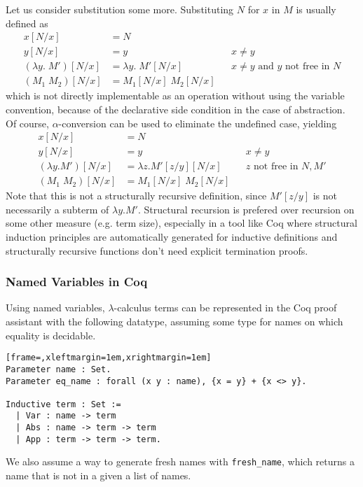 \documentclass[a4paper,11pt]{article}
\begin{document}
Let us consider substitution some more.
Substituting $N$ for $x$ in $M$ is usually defined as
\begin{align*}
  x[N/x]                 &= N\\
  y[N/x]                 &= y                      && \text{$x \neq y$} \\
  (\lambda y.\; M')[N/x] &= \lambda y. \; M'[N/x]  && \text{$x \neq y$ and $y$ not free in $N$} \\ %
  (M_1 \; M_2)[N/x]      &= M_1[N/x] \; M_2[N/x]
\end{align*}
which is not directly implementable as an operation without using the
variable convention, because of the declarative side condition in the
case of abstraction.
Of course, $\alpha$-conversion can be used to eliminate the undefined
case, yielding
\begin{align*}
  x[N/x]              &= N\\
  y[N/x]              &= y                       && \text{$x \neq y$} \\
  (\lambda y.M')[N/x] &= \lambda z.M'[z/y][N/x]  && \text{$z$ not free in $N, M'$} \\ %
  (M_1 \; M_2)[N/x]   &= M_1[N/x] \; M_2[N/x]
\end{align*}
Note that this is not a structurally recursive definition, since
$M'[z/y]$ is not necessarily a subterm of $\lambda y.M'$.
Structural recursion is prefered over recursion on some other measure
(e.g. term size), especially in a tool like Coq where structural
induction principles are automatically generated for inductive
definitions and structurally recursive functions don't need explicit
termination proofs.

\subsubsection*{Named Variables in Coq}

Using named variables, $\lambda$-calculus terms can be represented in the
Coq proof assistant with the following datatype, assuming
some type for names on which equality is decidable.
\begin{lstlisting}[frame=,xleftmargin=1em,xrightmargin=1em]
Parameter name : Set.
Parameter eq_name : forall (x y : name), {x = y} + {x <> y}.

Inductive term : Set :=
  | Var : name -> term
  | Abs : name -> term -> term
  | App : term -> term -> term.
\end{lstlisting}
We also assume a way to generate fresh names with \lstinline{fresh_name},
which returns a name that is not in a given a list of names.
\end{document}

